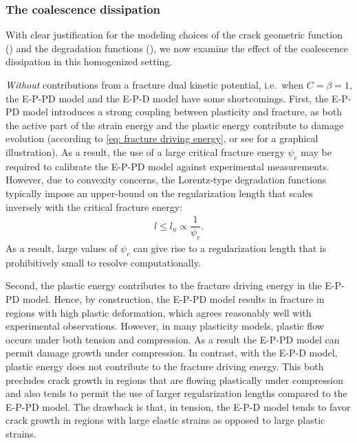 \subsubsection{The coalescence dissipation}
\label{section: Chapter5/verification/homogenized/coalescence}

With clear justification for the modeling choices of the crack geometric function () and the degradation functions (), we now examine the effect of the coalescence dissipation in this homogenized setting.

\textit{Without} contributions from a fracture dual kinetic potential, i.e.\ when $C = \beta = 1$, the E-P-PD model and the E-P-D model have some shortcomings.
First, the E-P-PD model introduces a strong coupling between plasticity and fracture, as both the active part of the strain energy and the plastic energy contribute to damage evolution (according to \eqref{eq: fracture driving energy}, or see  for a graphical illustration). As a result, the use of a large critical fracture energy $\psi_c$ may be required to calibrate the E-P-PD model against experimental measurements. However, due to convexity concerns, the Lorentz-type degradation functions typically impose an upper-bound on the regularization length that scales inversely with the critical fracture energy:
\begin{align}
  l \leqslant l_u \propto \dfrac{1}{\psi_c}.
  \label{eq: upper bound}
\end{align}
As a result, large values of $\psi_c$ can give rise to a regularization length that is prohibitively small to resolve computationally.



Second, the plastic energy contributes to the fracture driving energy in the E-P-PD model. Hence, by construction, the E-P-PD model results in fracture in regions with high plastic deformation, which agrees reasonably well with experimental observations. However, in many plasticity models, plastic flow occurs under both tension and compression. As a result the E-P-PD model can permit damage growth under compression. In contrast, with the E-P-D model, plastic energy does not contribute to the fracture driving energy.  This both precludes crack growth in regions that are flowing plastically under compression and also tends to permit the use of larger regularization lengths compared to the E-P-PD model.  The drawback is that, in tension, the E-P-D model tends to favor crack growth in regions with large elastic strains as opposed to large plastic strains.

